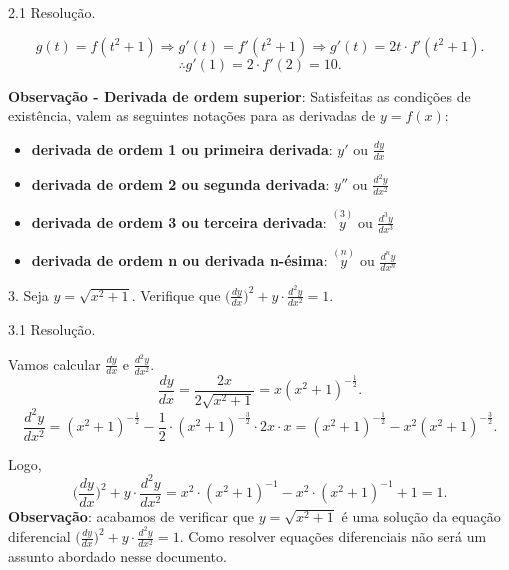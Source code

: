 \documentclass{article}
\begin{document}
{\begin{newpage}
\begin{flushleft}
\end{flushleft}
\vspace{0.3cm}
\begin{flushleft}
2.1 Resolução.
\end{flushleft}
\begin{equation*} g(t) = f(t^2 + 1) \Rightarrow g'(t)=f'(t^2 + 1) \Rightarrow g'(t)=2t\cdot f'(t^2 +1) .\end{equation*}
$$\therefore g'(1)=2\cdot f'(2) = 10.$$
\par
\vspace{0.3cm}
\textbf{Observação - Derivada de ordem superior}: Satisfeitas as condições de existência, valem as seguintes notações para as derivadas de $y=f(x)$:
\begin{itemize}
\item \textbf{derivada de ordem 1 ou primeira derivada}: $y'$ ou $\displaystyle{\frac{dy}{dx}}$
\item \textbf{derivada de ordem 2 ou segunda derivada}: $y''$ ou $\displaystyle{\frac{d^{2}y}{dx^2}}$
\item \textbf{derivada de ordem 3 ou terceira derivada}: $\overset{(3)}{y}$ ou $\displaystyle{\frac{d^{3}y}{dx^3}}$
\item \textbf{derivada de ordem n ou derivada n-ésima}: $\overset{(n)}{y}$ ou $\displaystyle{\frac{d^{n}y}{dx^n}}$
\end{itemize}
\vspace{0.3cm}
\begin{flushleft}
3. Seja $y=\sqrt{x^2 +1}$. Verifique que $\Big(\displaystyle{\frac{dy}{dx}}\Big)^2 + y\cdot\displaystyle{\frac{d^{2}y}{dx^2}} = 1.$
\end{flushleft}
\vspace{0.3cm}
\begin{flushleft}
3.1 Resolução.
\end{flushleft}
\par Vamos calcular $\displaystyle{\frac{dy}{dx}}$ e $\displaystyle{\frac{d^{2}y}{dx^2}}$.
\begin{equation*} \displaystyle{\frac{dy}{dx} = \frac{2x}{2\sqrt{x^2 + 1}} = x(x^2 + 1)^{-\frac{1}{2}}}. \end{equation*}
\begin{equation*} \displaystyle{\frac{d^{2}y}{dx^2} = (x^2 + 1)^{-\frac{1}{2}} - \frac{1}{2}\cdot (x^2 + 1)^{-\frac{3}{2}} \cdot 2x\cdot x = (x^2 + 1)^{-\frac{1}{2}} - x^{2}(x^2 + 1)^{-\frac{3}{2}}}. \end{equation*}
\vspace{0.2cm}
\par Logo,
\begin{equation*} \Big(\displaystyle{\frac{dy}{dx}}\Big)^2 + y\cdot\displaystyle{\frac{d^{2}y}{dx^2}} = \displaystyle{x^2\cdot (x^2 + 1)^{-1} - x^2\cdot (x^2 + 1)^{-1} + 1 = 1} .\end{equation*}
\vspace{0.3cm}
\textbf{Observação}: acabamos de verificar que $y=\sqrt{x^2 + 1}$ é uma solução da equação diferencial $\Big(\displaystyle{\frac{dy}{dx}}\Big)^2 + y\cdot\displaystyle{\frac{d^{2}y}{dx^2}} = 1.$ Como resolver equações diferenciais não será um assunto abordado nesse documento.
\vspace{0.3cm}

\end{newpage}}
\end{document}
